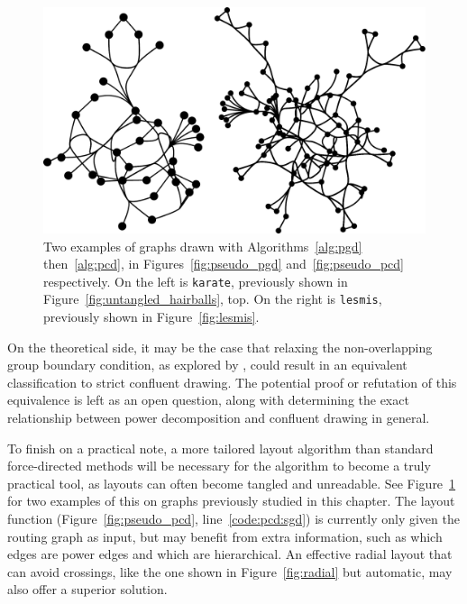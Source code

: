 \begin{figure}
  \centering
  \includegraphics[width=\linewidth]{power/power_karate_lesmis.pdf}
  \caption[Examples of networks drawn with the power-confluent algorithm]{Two examples of graphs drawn with Algorithms~\ref{alg:pgd} then~\ref{alg:pcd}, in Figures~\ref{fig:pseudo_pgd} and~\ref{fig:pseudo_pcd} respectively. On the left is \texttt{karate}, previously shown in Figure~\ref{fig:untangled_hairballs}, top. On the right is \texttt{lesmis}, previously shown in Figure~\ref{fig:lesmis}.}
  \label{fig:power_karate_lesmis}
\end{figure}

On the theoretical side, it may be the case that relaxing the non-overlapping group boundary condition, as explored by \citet{Ahnert2014}, could result in an equivalent classification to strict confluent drawing.
The potential proof or refutation of this equivalence is left as an open question, along with determining the exact relationship between power decomposition and confluent drawing in general.

To finish on a practical note, a more tailored layout algorithm than standard force-directed methods will be necessary for the algorithm to become a truly practical tool, as layouts can often become tangled and unreadable. See Figure~\ref{fig:power_karate_lesmis} for two examples of this on graphs previously studied in this chapter.
The layout function (Figure~\ref{fig:pseudo_pcd}, line~\ref{code:pcd:sgd}) is currently only given the routing graph as input, but may benefit from extra information, such as which edges are power edges and which are hierarchical. An effective radial layout that can avoid crossings, like the one shown in Figure~\ref{fig:radial} but automatic, may also offer a superior solution.
